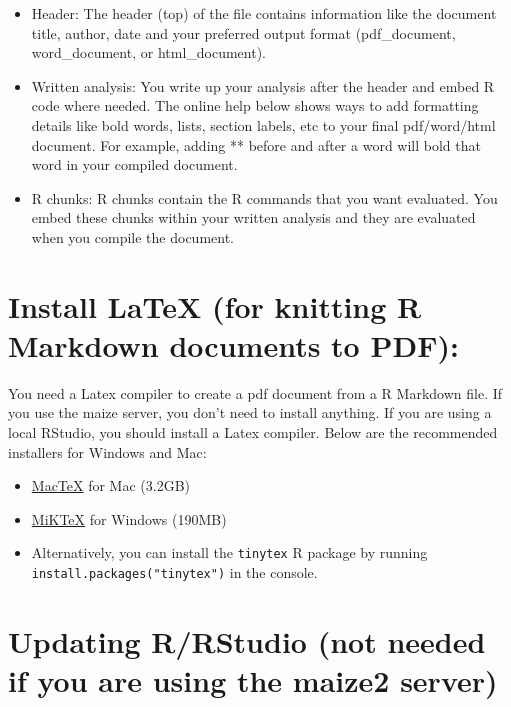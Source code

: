 \documentclass[
]{book}
\begin{document}
\begin{itemize}
\item
  Header: The header (top) of the file contains information like the document title, author, date and your preferred output format (pdf\_document, word\_document, or html\_document).
\item
  Written analysis: You write up your analysis after the header and embed R code where needed. The online help below shows ways to add formatting details like bold words, lists, section labels, etc to your final pdf/word/html document. For example, adding ** before and after a word will bold that word in your compiled document.
\item
  R chunks: R chunks contain the R commands that you want evaluated. You embed these chunks within your written analysis and they are evaluated when you compile the document.
\end{itemize}

\hypertarget{install-latex-for-knitting-r-markdown-documents-to-pdf}{%
\section{Install LaTeX (for knitting R Markdown documents to PDF):}\label{install-latex-for-knitting-r-markdown-documents-to-pdf}}

You need a Latex compiler to create a pdf document from a R Markdown file. If you use the maize server, you don't need to install anything. If you are using a local RStudio, you should install a Latex compiler. Below are the recommended installers for Windows and Mac:

\begin{itemize}
\item
  \href{https://www.tug.org/mactex/}{MacTeX} for Mac (3.2GB)
\item
  \href{https://miktex.org/download}{MiKTeX} for Windows (190MB)
\item
  Alternatively, you can install the \texttt{tinytex} R package by running
  \texttt{install.packages("tinytex")} in the console.
\end{itemize}

\hypertarget{updating-rrstudio-not-needed-if-you-are-using-the-maize2-server}{%
\section{Updating R/RStudio (not needed if you are using the maize2 server)}\label{updating-rrstudio-not-needed-if-you-are-using-the-maize2-server}}
\end{document}
